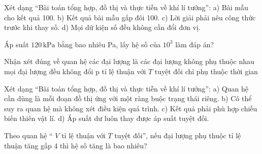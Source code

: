 \begin{ex}
Xét dạng “Bài toán tổng hợp, đồ thị và thực tiễn về khí lí tưởng”: a) Bài mẫu cho kết quả 100. b) Kết quả bài mẫu gấp đôi 100. c) Lời giải phải nêu công thức trước khi thay số. d) Mọi dữ kiện số đều không cần đổi đơn vị.
\choiceTF

\end{ex}

\begin{ex}
Áp suất $120\,\text{kPa}$ bằng bao nhiêu Pa, lấy hệ số của $10^3$ làm đáp án?
\end{ex}

\begin{ex}
Nhận xét đúng về quan hệ các đại lượng là
\choice
{các đại lượng không phụ thuộc nhau}
{mọi đại lượng đều không đổi}
{\True p tỉ lệ thuận với $T$ tuyệt đối}
{chỉ phụ thuộc thời gian}
\end{ex}

\begin{ex}
Xét dạng “Bài toán tổng hợp, đồ thị và thực tiễn về khí lí tưởng”: a) Quan hệ cần dùng là mỗi đoạn đồ thị ứng với một ràng buộc trạng thái riêng. b) Có thể suy ra quan hệ mà không xét điều kiện quá trình. c) Kết quả phải phù hợp chiều biến thiên vật lí. d) Áp suất dư luôn thay được áp suất tuyệt đối.
\choiceTF

\end{ex}

\begin{ex}
Theo quan hệ “ $V$ tỉ lệ thuận với $T$ tuyệt đối”, nếu đại lượng phụ thuộc tỉ lệ thuận tăng gấp 4 thì hệ số tăng là bao nhiêu?
\end{ex}

